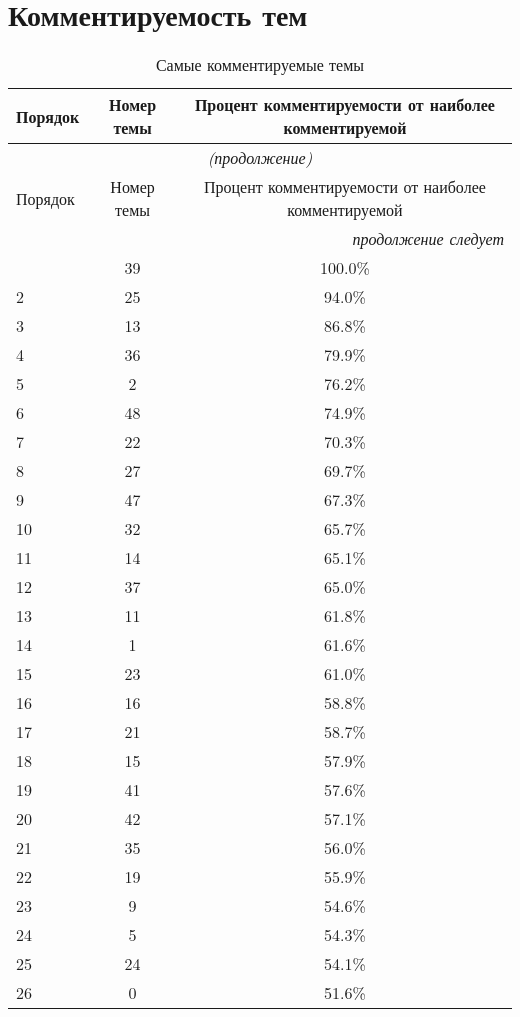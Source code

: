 \section{Комментируемость тем}
\begin{longtable}[c]{|l|c|c|}
	\caption{Самые комментируемые темы}\label{table:comments_by_topics} 
	\\ 
	\hline
	Порядок & Номер темы & Процент комментируемости от наиболее комментируемой \\ \hline
	\endfirsthead   \hline
	\multicolumn{3}{|c|}{\small\slshape (продолжение)}        \\ \hline
	Порядок & Номер темы & Процент комментируемости от наиболее комментируемой \\ \hline
	\endhead        \hline
	\multicolumn{3}{|r|}{\small\slshape продолжение следует}  \\ \hline
	\endfoot        \hline
	\endlastfoot
		1 & 39 & 100.0\% \\
		2 & 25 & 94.0\% \\
		3 & 13 & 86.8\% \\
		4 & 36 & 79.9\% \\
		5 & 2 & 76.2\% \\
		6 & 48 & 74.9\% \\
		7 & 22 & 70.3\% \\
		8 & 27 & 69.7\% \\
		9 & 47 & 67.3\% \\
		10 & 32 & 65.7\% \\
		11 & 14 & 65.1\% \\
		12 & 37 & 65.0\% \\
		13 & 11 & 61.8\% \\
		14 & 1 & 61.6\% \\
		15 & 23 & 61.0\% \\
		16 & 16 & 58.8\% \\
		17 & 21 & 58.7\% \\
		18 & 15 & 57.9\% \\
		19 & 41 & 57.6\% \\
		20 & 42 & 57.1\% \\
		21 & 35 & 56.0\% \\
		22 & 19 & 55.9\% \\
		23 & 9 & 54.6\% \\
		24 & 5 & 54.3\% \\
		25 & 24 & 54.1\% \\
		26 & 0 & 51.6\% \\

\end{longtable}
